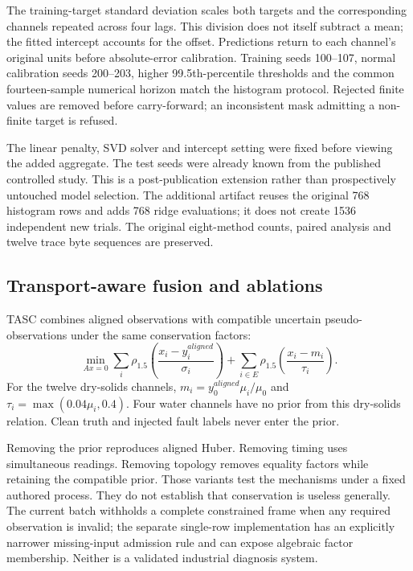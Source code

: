 \documentclass[11pt,a4paper]{article}
\begin{document}
The training-target standard deviation scales both targets and the corresponding channels repeated across four lags. This division does not itself subtract a mean; the fitted intercept accounts for the offset. Predictions return to each channel's original units before absolute-error calibration. Training seeds 100--107, normal calibration seeds 200--203, higher 99.5th-percentile thresholds and the common fourteen-sample numerical horizon match the histogram protocol. Rejected finite values are removed before carry-forward; an inconsistent mask admitting a non-finite target is refused.

The linear penalty, SVD solver and intercept setting were fixed before viewing the added aggregate. The test seeds were already known from the published controlled study. This is a post-publication extension rather than prospectively untouched model selection. The additional artifact reuses the original 768 histogram rows and adds 768 ridge evaluations; it does not create 1536 independent new trials. The original eight-method counts, paired analysis and twelve trace byte sequences are preserved.

\subsection{Transport-aware fusion and ablations}
TASC combines aligned observations with compatible uncertain pseudo-observations under the same conservation factors:
\begin{equation}
 \min_{Ax=0}\sum_i\rho_{1.5}\left(\frac{x_i-y_i^{aligned}}{\sigma_i}\right)
 +\sum_{i\in E}\rho_{1.5}\left(\frac{x_i-m_i}{\tau_i}\right).
\end{equation}
For the twelve dry-solids channels, $m_i=y_0^{aligned}\mu_i/\mu_0$ and $\tau_i=\max(0.04\mu_i,0.4)$. Four water channels have no prior from this dry-solids relation. Clean truth and injected fault labels never enter the prior.

Removing the prior reproduces aligned Huber. Removing timing uses simultaneous readings. Removing topology removes equality factors while retaining the compatible prior. Those variants test the mechanisms under a fixed authored process. They do not establish that conservation is useless generally. The current batch withholds a complete constrained frame when any required observation is invalid; the separate single-row implementation has an explicitly narrower missing-input admission rule and can expose algebraic factor membership. Neither is a validated industrial diagnosis system.
\end{document}
